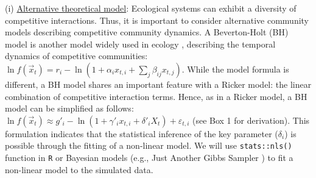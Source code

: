 \documentclass[12pt, class=article, crop=false]{standalone}
\begin{document}
(i) \ul{Alternative theoretical model}:
Ecological systems can exhibit a diversity of competitive interactions.
Thus, it is important to consider alternative community models describing competitive community dynamics. 
A Beverton-Holt (BH) model is another model widely used in ecology \citep{otto_biologists_2011}, describing the temporal dynamics of competitive communities: $\ln f(\overset{\rightarrow}{x}_{t}) = r_i - \ln(1 + \alpha_i x_{t,i} + \sum_j \beta_{ij} x_{t,j})$. 
While the model formula is different, a BH model shares an important feature with a Ricker model: the linear combination of competitive interaction terms.
Hence, as in a Ricker model, a BH model can be simplified as follows: $\ln f(\overset{\rightarrow}{x}_{t}) \approx g'_{i} - \ln(1 + \gamma'_i x_{t,i} + \delta'_i X_t) + \varepsilon_{t,i}$ (see Box 1 for derivation).
This formulation indicates that the statistical inference of the key parameter ($\delta_i$) is possible through the fitting of a non-linear model.
We will use \texttt{stats::nls()} function in \texttt{R} or Bayesian models (e.g., Just Another Gibbs Sampler \citep{plummer_jags_2003}) to fit a non-linear model to the simulated data.
\end{document}
